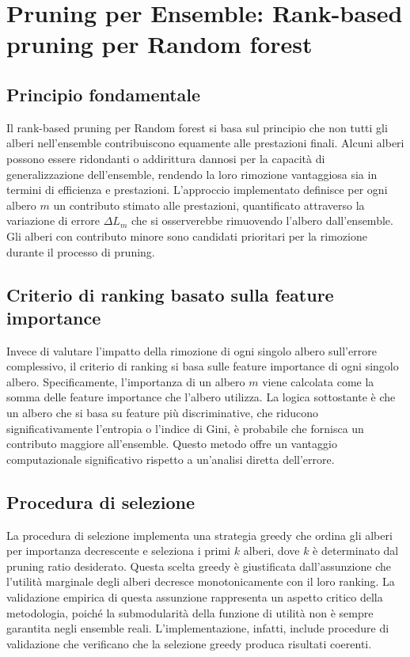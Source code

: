 \documentclass[a4paper,12pt]{report}
\begin{document}
	\section{Pruning per Ensemble: Rank-based pruning per Random forest}
	
	\subsection{Principio fondamentale}
	Il rank-based pruning per Random forest si basa sul principio che non tutti gli alberi nell'ensemble contribuiscono equamente alle prestazioni finali. Alcuni alberi possono essere ridondanti o addirittura dannosi per la capacità di generalizzazione dell'ensemble, rendendo la loro rimozione vantaggiosa sia in termini di efficienza e prestazioni. L'approccio implementato definisce per ogni albero $m$ un contributo stimato alle prestazioni, quantificato attraverso la variazione di errore $\Delta L_m$ che si osserverebbe rimuovendo l'albero dall'ensemble. Gli alberi con contributo minore sono candidati prioritari per la rimozione durante il processo di pruning.
	
	\subsection{Criterio di ranking basato sulla feature importance}
	Invece di valutare l'impatto della rimozione di ogni singolo albero sull'errore complessivo, il criterio di ranking si basa sulle feature importance di ogni singolo albero. Specificamente, l'importanza di un albero $m$ viene calcolata come la somma delle feature importance che l'albero utilizza. La logica sottostante è che un albero che si basa su feature più discriminative, che riducono significativamente l'entropia o l'indice di Gini, è probabile che fornisca un contributo maggiore all'ensemble. Questo metodo offre un vantaggio computazionale significativo rispetto a un'analisi diretta dell'errore.
	
	\subsection{Procedura di selezione}
	La procedura di selezione implementa una strategia greedy che ordina gli alberi per importanza decrescente e seleziona i primi $k$ alberi, dove $k$ è determinato dal pruning ratio desiderato. Questa scelta greedy è giustificata dall'assunzione che l'utilità marginale degli alberi decresce monotonicamente con il loro ranking. La validazione empirica di questa assunzione rappresenta un aspetto critico della metodologia, poiché la submodularità della funzione di utilità non è sempre garantita negli ensemble reali. L'implementazione, infatti, include procedure di validazione che verificano che la selezione greedy produca risultati coerenti.
	
\end{document}

